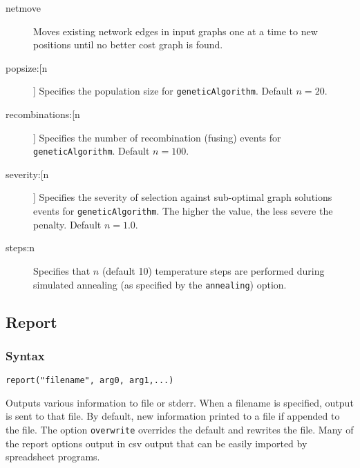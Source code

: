 \begin{description}
		\item[netmove] Moves existing network edges in input graphs one at a time to new positions 
		until no better cost graph 
		is found.
			
		\item[popsize:[n]] Specifies the population size for \texttt{geneticAlgorithm}. Default $n=20$.
			
		\item[recombinations:[n]] Specifies the number of recombination (fusing) events for 
		\texttt{geneticAlgorithm}. Default $n=100$.
			
		\item[severity:[n]] Specifies the severity of selection against sub-optimal graph solutions events 
		for \texttt{geneticAlgorithm}. The higher the value, the less severe the penalty. Default $n=1.0$.
			
		\item[steps:n] Specifies that $n$ (default 10) temperature steps are performed during simulated 
		annealing (as specified by the \texttt{annealing}) option.
		\end{description}
	
\subsection{Report}
	\subsubsection{Syntax}
		\texttt{report("filename", arg0, arg1,...)}
	
	\begin{phygdescription}
		{Outputs various information to file or stderr. When a filename is specified, output is sent to 
		that file. By default, new information printed to a file if appended to the file. The option 
		\texttt{overwrite} overrides the default and rewrites the file. Many of the report options output in 
		csv output that can be easily imported by spreadsheet programs.}
	\end{phygdescription}
	
